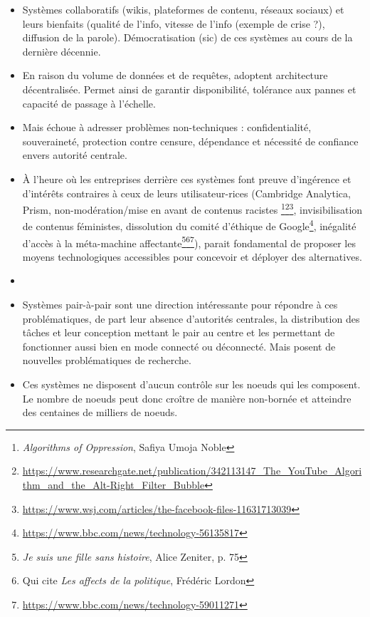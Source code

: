 \begin{itemize}
    \item Systèmes collaboratifs (wikis, plateformes de contenu, réseaux sociaux) et leurs bienfaits (qualité de l'info, vitesse de l'info (exemple de crise ?), diffusion de la parole).
      Démocratisation (sic) de ces systèmes au cours de la dernière décennie.
    \item En raison du volume de données et de requêtes, adoptent architecture décentralisée.
      Permet ainsi de garantir disponibilité, tolérance aux pannes et capacité de passage à l'échelle.
    \item Mais échoue à adresser problèmes non-techniques : confidentialité, souveraineté, protection contre censure, dépendance et nécessité de confiance envers autorité centrale.
    \item À l'heure où les entreprises derrière ces systèmes font preuve d'ingérence et d'intérêts contraires à ceux de leurs utilisateur-rices (Cambridge Analytica, Prism, non-modération/mise en avant de contenus racistes \footnote{\emph{Algorithms of Oppression}, Safiya Umoja Noble}\footnote{\url{https://www.researchgate.net/publication/342113147_The_YouTube_Algorithm_and_the_Alt-Right_Filter_Bubble}}\footnote{\url{https://www.wsj.com/articles/the-facebook-files-11631713039}}, invisibilisation de contenus féministes, dissolution du comité d'éthique de Google\footnote{\url{https://www.bbc.com/news/technology-56135817}}, inégalité d'accès à la méta-machine affectante\footnote{\emph{Je suis une fille sans histoire}, Alice Zeniter, p. 75}\footnote{Qui cite \emph{Les affects de la politique}, Frédéric Lordon}\footnote{\url{https://www.bbc.com/news/technology-59011271}}), parait fondamental de proposer les moyens technologiques accessibles pour concevoir et déployer des alternatives.
    \item {}
    \item Systèmes pair-à-pair sont une direction intéressante pour répondre à ces problématiques, de part leur absence d'autorités centrales, la distribution des tâches et leur conception mettant le pair au centre et les permettant de fonctionner aussi bien en mode connecté ou déconnecté.
      Mais posent de nouvelles problématiques de recherche.
    \item Ces systèmes ne disposent d'aucun contrôle sur les noeuds qui les composent.
      Le nombre de noeuds peut donc croître de manière non-bornée et atteindre des centaines de milliers de noeuds.

\end{itemize}
